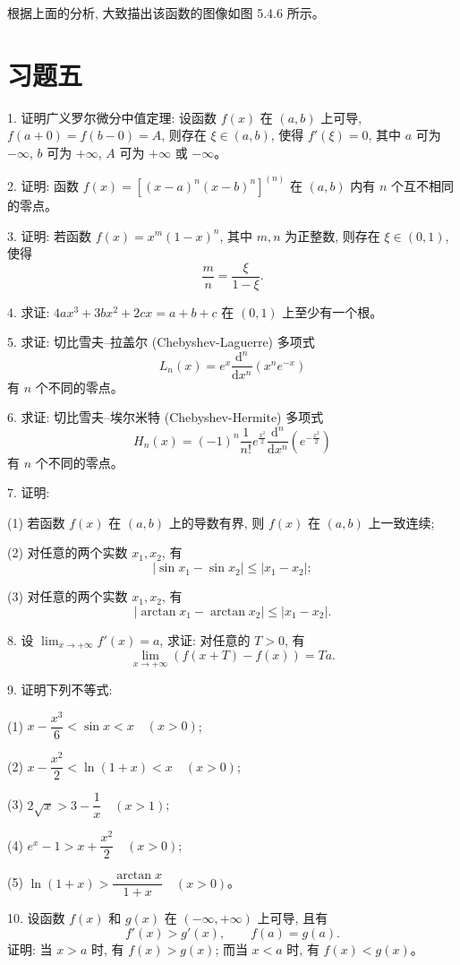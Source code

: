 \documentclass[UTF8,12pt,a4paper,fontset=fandol]{ctexart}
\begin{document}
根据上面的分析, 大致描出该函数的图像如图 5.4.6 所示。

\section*{习题五}

1. 证明广义罗尔微分中值定理: 设函数 $f(x)$ 在 $(a,b)$ 上可导, $f(a+0)=f(b-0)=A$, 则存在 $\xi\in(a,b)$, 使得 $f'(\xi)=0$, 其中 $a$ 可为 $-\infty$, $b$ 可为 $+\infty$, $A$ 可为 $+\infty$ 或 $-\infty$。

2. 证明: 函数 $f(x)=[(x-a)^n(x-b)^n]^{(n)}$ 在 $(a,b)$ 内有 $n$ 个互不相同的零点。

3. 证明: 若函数 $f(x)=x^m(1-x)^n$, 其中 $m,n$ 为正整数, 则存在 $\xi\in(0,1)$, 使得
\[
  \frac mn=\frac{\xi}{1-\xi}.
\]

4. 求证: $4ax^3+3bx^2+2cx=a+b+c$ 在 $(0,1)$ 上至少有一个根。

5. 求证: 切比雪夫--拉盖尔 (Chebyshev-Laguerre) 多项式
\[
  L_n(x)=e^x\frac{\mathrm d^n}{\mathrm dx^n}(x^ne^{-x})
\]
有 $n$ 个不同的零点。

6. 求证: 切比雪夫--埃尔米特 (Chebyshev-Hermite) 多项式
\[
  H_n(x)=(-1)^n\frac1{n!}e^{\frac{x^2}2}\frac{\mathrm d^n}{\mathrm dx^n}\left(e^{-\frac{x^2}2}\right)
\]
有 $n$ 个不同的零点。

7. 证明:

(1) 若函数 $f(x)$ 在 $(a,b)$ 上的导数有界, 则 $f(x)$ 在 $(a,b)$ 上一致连续;

(2) 对任意的两个实数 $x_1,x_2$, 有
\[
  |\sin x_1-\sin x_2|\leqslant |x_1-x_2|;
\]

(3) 对任意的两个实数 $x_1,x_2$, 有
\[
  |\arctan x_1-\arctan x_2|\leqslant |x_1-x_2|.
\]

8. 设 $\lim_{x\to+\infty}f'(x)=a$, 求证: 对任意的 $T>0$, 有
\[
  \lim_{x\to+\infty}(f(x+T)-f(x))=Ta.
\]

9. 证明下列不等式:

(1) $x-\dfrac{x^3}6<\sin x<x\quad (x>0)$;

(2) $x-\dfrac{x^2}2<\ln(1+x)<x\quad (x>0)$;

(3) $2\sqrt x>3-\dfrac1x\quad (x>1)$;

(4) $e^x-1>x+\dfrac{x^2}2\quad (x>0)$;

(5) $\ln(1+x)>\dfrac{\arctan x}{1+x}\quad (x>0)$。

10. 设函数 $f(x)$ 和 $g(x)$ 在 $(-\infty,+\infty)$ 上可导, 且有
\[
  f'(x)>g'(x),\qquad f(a)=g(a).
\]
证明: 当 $x>a$ 时, 有 $f(x)>g(x)$; 而当 $x<a$ 时, 有 $f(x)<g(x)$。
\end{document}
